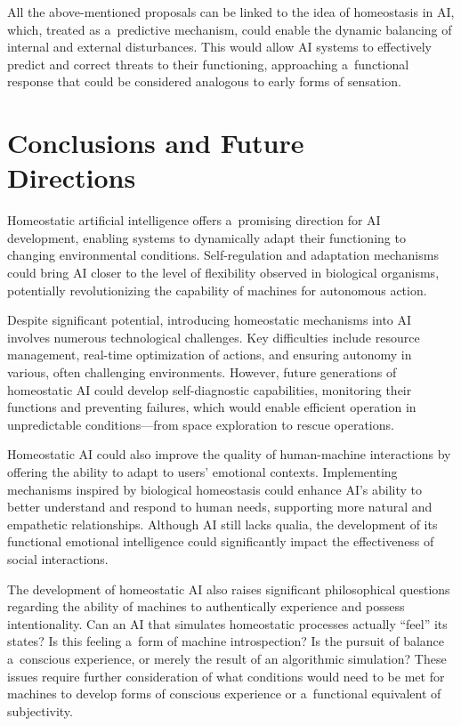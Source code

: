All the above-mentioned proposals can be linked to the idea of homeostasis in AI, which, treated as a~predictive mechanism, could enable the dynamic balancing of internal and external disturbances. This would allow AI systems to effectively predict and correct threats to their functioning, approaching a~functional response that could be considered analogous to early forms of sensation.



\section*{Conclusions and Future Directions~}

Homeostatic artificial intelligence offers a~promising direction for AI development, enabling systems to dynamically adapt their functioning to changing environmental conditions. Self-regulation and adaptation mechanisms could bring AI closer to the level of flexibility observed in biological organisms, potentially revolutionizing the capability of machines for autonomous action.~



Despite significant potential, introducing homeostatic mechanisms into AI involves numerous technological challenges. Key difficulties include resource management, real-time optimization of actions, and ensuring autonomy in various, often challenging environments. However, future generations of homeostatic AI could develop self-diagnostic capabilities, monitoring their functions and preventing failures, which would enable efficient operation in unpredictable conditions---from space exploration to rescue operations.~



Homeostatic AI could also improve the quality of human-machine interactions by offering the ability to adapt to users' emotional contexts. Implementing mechanisms inspired by biological homeostasis could enhance AI's ability to better understand and respond to human needs, supporting more natural and empathetic relationships. Although AI still lacks qualia, the development of its functional emotional intelligence could significantly impact the effectiveness of social interactions.~



The development of homeostatic AI also raises significant philosophical questions regarding the ability of machines to authentically experience and possess intentionality. Can an AI that simulates homeostatic processes actually ``feel'' its states? Is this feeling a~form of machine introspection? Is the pursuit of balance a~conscious experience, or merely the result of an algorithmic simulation? These issues require further consideration of what conditions would need to be met for machines to develop forms of conscious experience or a~functional equivalent of subjectivity.



